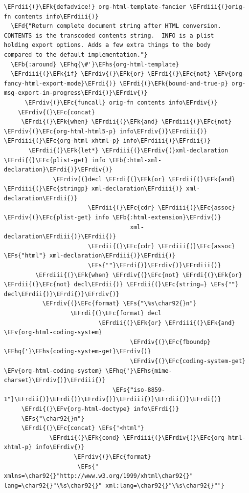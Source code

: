 \documentclass{scrartcl}
\newcommand{\EFk}[1]{\textcolor{EFk}{#1}} %
\newcommand{\EFd}[1]{\textcolor{EFd}{#1}} %
\newcommand{\EFs}[1]{\textcolor{EFs}{#1}} %
\newcommand{\EFb}[1]{\textcolor{EFb}{#1}} %
\newcommand{\EFc}[1]{\textcolor{EFc}{#1}} %
\newcommand{\EFv}[1]{\textcolor{EFv}{#1}} %
\newcommand{\EFhq}[1]{#1} %
\newcommand{\EFhs}[1]{#1} %
\newcommand{\EFrdi}[1]{#1} %
\newcommand{\EFrdii}[1]{#1} %
\newcommand{\EFrdiii}[1]{#1} %
\newcommand{\EFrdiv}[1]{#1} %
\begin{document}
\begin{Code}
\begin{Verbatim}[]
\EFrdii{(}\EFk{defadvice!} org-html-template-fancier \EFrdiii{(}orig-fn contents info\EFrdiii{)}
  \EFd{"Return complete document string after HTML conversion.
CONTENTS is the transcoded contents string.  INFO is a plist
holding export options. Adds a few extra things to the body
compared to the default implementation."}
  \EFb{:around} \EFhq{\#'}\EFhs{org-html-template}
  \EFrdiii{(}\EFk{if} \EFrdiv{(}\EFk{or} \EFrdi{(}\EFc{not} \EFv{org-fancy-html-export-mode}\EFrdi{)} \EFrdi{(}\EFk{bound-and-true-p} org-msg-export-in-progress\EFrdi{)}\EFrdiv{)}
      \EFrdiv{(}\EFc{funcall} orig-fn contents info\EFrdiv{)}
    \EFrdiv{(}\EFc{concat}
     \EFrdi{(}\EFk{when} \EFrdii{(}\EFk{and} \EFrdiii{(}\EFc{not} \EFrdiv{(}\EFc{org-html-html5-p} info\EFrdiv{)}\EFrdiii{)} \EFrdiii{(}\EFc{org-html-xhtml-p} info\EFrdiii{)}\EFrdii{)}
       \EFrdii{(}\EFk{let*} \EFrdiii{(}\EFrdiv{(}xml-declaration \EFrdi{(}\EFc{plist-get} info \EFb{:html-xml-declaration}\EFrdi{)}\EFrdiv{)}
              \EFrdiv{(}decl \EFrdi{(}\EFk{or} \EFrdii{(}\EFk{and} \EFrdiii{(}\EFc{stringp} xml-declaration\EFrdiii{)} xml-declaration\EFrdii{)}
                        \EFrdii{(}\EFc{cdr} \EFrdiii{(}\EFc{assoc} \EFrdiv{(}\EFc{plist-get} info \EFb{:html-extension}\EFrdiv{)}
                                    xml-declaration\EFrdiii{)}\EFrdii{)}
                        \EFrdii{(}\EFc{cdr} \EFrdiii{(}\EFc{assoc} \EFs{"html"} xml-declaration\EFrdiii{)}\EFrdii{)}
                        \EFs{""}\EFrdi{)}\EFrdiv{)}\EFrdiii{)}
         \EFrdiii{(}\EFk{when} \EFrdiv{(}\EFc{not} \EFrdi{(}\EFk{or} \EFrdii{(}\EFc{not} decl\EFrdii{)} \EFrdii{(}\EFc{string=} \EFs{""} decl\EFrdii{)}\EFrdi{)}\EFrdiv{)}
           \EFrdiv{(}\EFc{format} \EFs{"\%s\char92{}n"}
                   \EFrdi{(}\EFc{format} decl
                           \EFrdii{(}\EFk{or} \EFrdiii{(}\EFk{and} \EFv{org-html-coding-system}
                                    \EFrdiv{(}\EFc{fboundp} \EFhq{'}\EFhs{coding-system-get}\EFrdiv{)}
                                    \EFrdiv{(}\EFc{coding-system-get} \EFv{org-html-coding-system} \EFhq{'}\EFhs{mime-charset}\EFrdiv{)}\EFrdiii{)}
                               \EFs{"iso-8859-1"}\EFrdii{)}\EFrdi{)}\EFrdiv{)}\EFrdiii{)}\EFrdii{)}\EFrdi{)}
     \EFrdi{(}\EFv{org-html-doctype} info\EFrdi{)}
     \EFs{"\char92{}n"}
     \EFrdi{(}\EFc{concat} \EFs{"<html"}
             \EFrdii{(}\EFk{cond} \EFrdiii{(}\EFrdiv{(}\EFc{org-html-xhtml-p} info\EFrdiv{)}
                    \EFrdiv{(}\EFc{format}
                     \EFs{" xmlns=\char92{}"http://www.w3.org/1999/xhtml\char92{}" lang=\char92{}"\%s\char92{}" xml:lang=\char92{}"\%s\char92{}""}

\end{Verbatim}
\end{Code}
\end{document}
